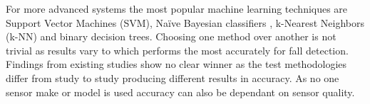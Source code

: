 For more advanced systems  the most popular machine learning techniques are Support Vector Machines (SVM), Naïve Bayesian classifiers , k-Nearest Neighbors (k-NN) and binary decision trees. Choosing one method over another is not trivial as results vary to which performs the most accurately for fall detection. Findings from existing studies show no clear winner as the test methodologies differ from study to study producing different results in accuracy. As no one sensor make or model is used accuracy can also be dependant on sensor quality.









